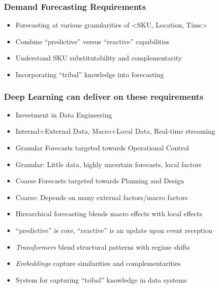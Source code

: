 \documentclass[handout]{beamer}
\begin{document}
\begin{frame}
\frametitle{Demand Forecasting Requirements}
\pause
\begin{itemize}[<+->]
\item Forecasting at various granularities of <SKU, Location, Time>
\item Combine “predictive” versus “reactive” capabilities
\item Understand SKU substitutability and complementarity
\item Incorporating ``tribal'' knowledge into forecasting

\end{itemize}
\end{frame}

\begin{frame}
\frametitle{Deep Learning can deliver on these requirements}
\pause
\begin{itemize}[<+->]
\item Investment in Data Engineering
\item Internal+External Data, Macro+Local Data, Real-time streaming
\item Granular Forecasts targeted towards Operational Control
\item Granular: Little data, highly uncertain forecasts, local factors
\item Coarse Forecasts targeted towards Planning and Design
\item Coarse:  Depends on many external factors/macro factors
\item Hierarchical forecasting blends macro effects with local effects
\item “predictive” is core, “reactive” is an update upon event reception 
\item {\em Transformers} blend structural patterns with regime shifts
\item {\em Embeddings} capture similarities and complementarities
\item System for capturing ``tribal'' knowledge in data systems
\end{itemize}
\end{frame}
\end{document}
